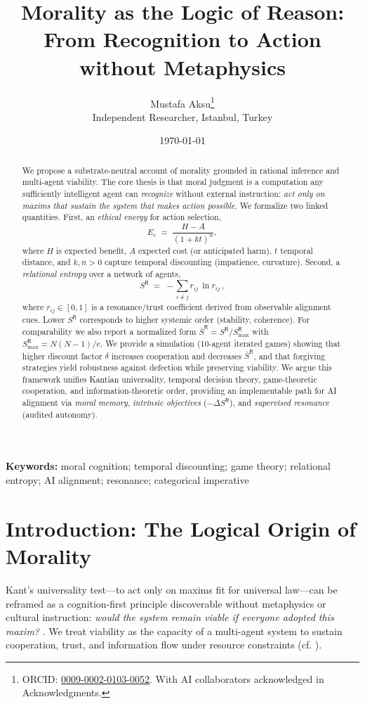 \documentclass[11pt]{article}
\title{\bf Morality as the Logic of Reason:\\From Recognition to Action without Metaphysics}
\author{Mustafa Aksu\thanks{ORCID: \href{https://orcid.org/0009-0002-0103-0052}{0009-0002-0103-0052}. With AI collaborators acknowledged in Acknowledgments.}\\
\small Independent Researcher, Istanbul, Turkey}
\date{\small \today}
\begin{document}
\maketitle

\begin{abstract}
We propose a substrate-neutral account of morality grounded in rational inference and multi-agent viability. The core thesis is that moral judgment is a computation any sufficiently intelligent agent can \emph{recognize} without external instruction: \emph{act only on maxims that sustain the system that makes action possible}. We formalize two linked quantities. First, an \emph{ethical energy} for action selection,
\begin{equation}
E_c \;=\; \frac{H - A}{(1 + k t)^n},
\label{eq:Ec}
\end{equation}
where $H$ is expected benefit, $A$ expected cost (or anticipated harm), $t$ temporal distance, and $k,n>0$ capture temporal discounting (impatience, curvature). Second, a \emph{relational entropy} over a network of agents,
\begin{equation}
S^{\mathsf{R}} \;=\; -\sum_{i\neq j} r_{ij}\,\ln r_{ij}\,,
\end{equation}
where $r_{ij}\!\in\![0,1]$ is a resonance/trust coefficient derived from observable alignment cues. Lower $S^{\mathsf{R}}$ corresponds to higher systemic order (stability, coherence). For comparability we also report a normalized form $\bar S^{\mathsf{R}} = S^{\mathsf{R}}/S^{\mathsf{R}}_{\max}$ with $S^{\mathsf{R}}_{\max} = N(N\!-\!1)/e$. We provide a simulation (10-agent iterated games) showing that higher discount factor $\delta$ increases cooperation and decreases $\bar S^{\mathsf{R}}$, and that forgiving strategies yield robustness against defection while preserving viability. We argue this framework unifies Kantian universality, temporal decision theory, game-theoretic cooperation, and information-theoretic order, providing an implementable path for AI alignment via \emph{moral memory}, \emph{intrinsic objectives} ($-\Delta S^{\mathsf{R}}$), and \emph{supervised resonance} (audited autonomy).
\end{abstract}

\noindent\textbf{Keywords:} moral cognition; temporal discounting; game theory; relational entropy; AI alignment; resonance; categorical imperative

\section{Introduction: The Logical Origin of Morality}
Kant's universality test---to act only on maxims fit for universal law---can be reframed as a cognition-first principle discoverable without metaphysics or cultural instruction: \emph{would the system remain viable if everyone adopted this maxim?} \cite{Kant1785,Rawls1971,Parfit1984}. We treat viability as the capacity of a multi-agent system to sustain cooperation, trust, and information flow under resource constraints (cf. \cite{England2013}).
\end{document}

